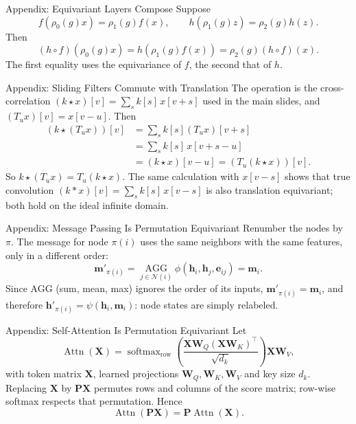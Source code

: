 \documentclass{ntuabeamer}
\begin{document}
\begin{frame}{Appendix: Equivariant Layers Compose}
  Suppose
  \[
    f(\rho_0(g)x)=\rho_1(g)f(x),
    \qquad
    h(\rho_1(g)z)=\rho_2(g)h(z).
  \]
  Then
  \[
    (h\circ f)(\rho_0(g)x)
    =h(\rho_1(g)f(x))
    =\rho_2(g)(h\circ f)(x).
  \]
  The first equality uses the equivariance of $f$, the second that of $h$.
\end{frame}

\begin{frame}{Appendix: Sliding Filters Commute with Translation}
  The operation is the cross-correlation $(k\star x)[v]=\sum_s k[s]\,x[v+s]$ used in the main slides,
  and $(T_u x)[v]=x[v-u]$. Then
  \begin{align*}
    (k\star(T_u x))[v]
      &=\sum_s k[s](T_u x)[v+s]\\
      &=\sum_s k[s]\,x[v+s-u]\\
      &=(k\star x)[v-u]=(T_u(k\star x))[v].
  \end{align*}
  So $k\star(T_u x)=T_u(k\star x)$. The same calculation with $x[v-s]$ shows that true convolution
  $(k*x)[v]=\sum_s k[s]\,x[v-s]$ is also translation equivariant; both hold on the ideal infinite domain.
\end{frame}

\begin{frame}{Appendix: Message Passing Is Permutation Equivariant}
  Renumber the nodes by $\pi$. The message for node $\pi(i)$ uses the same neighbors with the same features,
  only in a different order:
  \[
    \mathbf m'_{\pi(i)}=\underset{j\in\mathcal N(i)}{\operatorname{AGG}}\phi(\mathbf h_i,\mathbf h_j,\mathbf e_{ij})=\mathbf m_i .
  \]
  Since AGG (sum, mean, max) ignores the order of its inputs, $\mathbf m'_{\pi(i)}=\mathbf m_i$,
  and therefore $\mathbf h'_{\pi(i)}=\psi(\mathbf h_i,\mathbf m_i)$: node states are simply relabeled.
\end{frame}

\begin{frame}{Appendix: Self-Attention Is Permutation Equivariant}
  Let
  \[
    \operatorname{Attn}(\mathbf X)
    =\operatorname{softmax}_{\mathrm{row}}
      \!\left(\frac{\mathbf X\mathbf W_Q(\mathbf X\mathbf W_K)^\top}{\sqrt{d_k}}\right)
      \mathbf X\mathbf W_V,
  \]
  with token matrix $\mathbf X$, learned projections $\mathbf W_Q,\mathbf W_K,\mathbf W_V$ and key size $d_k$.
  Replacing $\mathbf X$ by $\mathbf P\mathbf X$ permutes rows and columns of the score matrix;
  row-wise softmax respects that permutation. Hence
  \[
    \operatorname{Attn}(\mathbf P\mathbf X)=\mathbf P\operatorname{Attn}(\mathbf X).
  \]
\end{frame}
\end{document}
